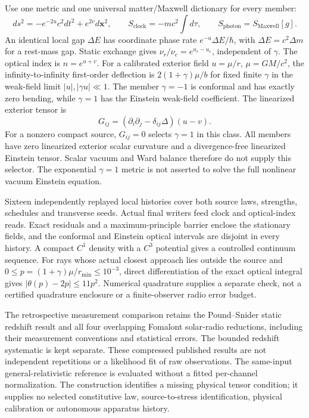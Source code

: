 Use one metric and one universal matter/Maxwell dictionary for every member:
\begin{equation}
 ds^2=-e^{-2u}c^2dt^2+e^{2v}d\mathbf x^2,
 \qquad S_{\mathrm{clock}}=-mc^2\int d\tau,
 \qquad S_{\mathrm{photon}}=S_{\mathrm{Maxwell}}[g].
 \label{eq:paired-source-metric}
\end{equation}
An identical local gap $\Delta E$ has coordinate phase rate
$e^{-u}\Delta E/\hbar$, with $\Delta E=c^2\Delta m$ for a rest-mass gap.
Static exchange gives $\nu_r/\nu_e=e^{u_r-u_e}$, independent of $\gamma$.
The optical index is $n=e^{u+v}$. For a calibrated exterior field
$u=\mu/r$, $\mu=GM/c^2$, the infinity-to-infinity first-order deflection is
$2(1+\gamma)\mu/b$ for fixed finite $\gamma$ in the weak-field limit
$|u|,|\gamma u|\ll1$. The member $\gamma=-1$ is conformal and has exactly
zero bending, while $\gamma=1$ has the Einstein weak-field coefficient.
The linearized exterior tensor is
\[
 G_{ij}=(\partial_i\partial_j-\delta_{ij}\Delta)(u-v).
\]
For a nonzero compact source, $G_{ij}=0$ selects $\gamma=1$ in this class.
All members have zero linearized exterior scalar curvature and a
divergence-free linearized Einstein tensor. Scalar vacuum and Ward balance
therefore do not supply this selector. The exponential $\gamma=1$ metric
is not asserted to solve the full nonlinear vacuum Einstein equation.

Sixteen independently replayed local histories cover both source laws,
strengths, schedules and transverse seeds. Actual final writers feed clock
and optical-index reads. Exact residuals and a maximum-principle barrier
enclose the stationary fields, and the conformal and Einstein optical
intervals are disjoint in every history. A compact $C^1$ density with a
$C^3$ potential gives a controlled continuum sequence. For rays whose
actual closest approach lies outside the source and
$0\le p=(1+\gamma)\mu/r_{\min}\le10^{-3}$, direct differentiation of the
exact optical integral gives $|\theta(p)-2p|\le11p^2$.
Numerical quadrature supplies a separate check, not a certified quadrature
enclosure or a finite-observer radio error budget.

The retrospective measurement comparison retains the Pound--Snider static
redshift result and all four overlapping Fomalont solar-radio reductions,
including their measurement conventions and statistical errors. The bounded
redshift systematic is kept separate. These compressed published results
are not independent repetitions or a likelihood fit of raw observations.
The same-input general-relativistic reference is evaluated without a fitted
per-channel normalization. The construction identifies a missing physical
tensor condition; it supplies no selected constitutive law, source-to-stress
identification, physical calibration or autonomous apparatus history.
